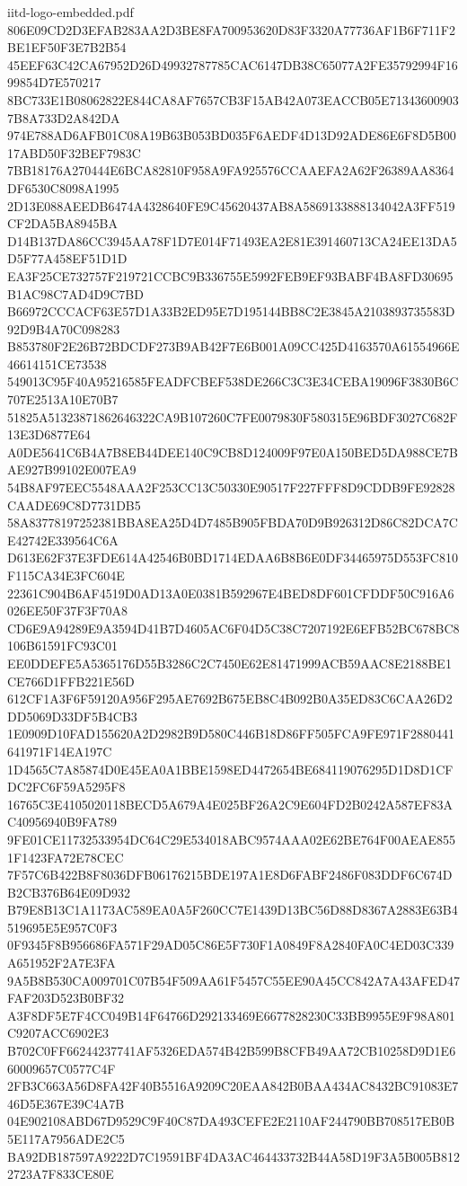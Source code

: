 \begin{filecontents*}[overwrite]{iitd-logo-embedded.pdf}
806E09CD2D3EFAB283AA2D3BE8FA700953620D83F3320A77736AF1B6F711F2BE1EF50F3E7B2B54
45EEF63C42CA67952D26D49932787785CAC6147DB38C65077A2FE35792994F1699854D7E570217
8BC733E1B08062822E844CA8AF7657CB3F15AB42A073EACCB05E713436009037B8A733D2A842DA
974E788AD6AFB01C08A19B63B053BD035F6AEDF4D13D92ADE86E6F8D5B0017ABD50F32BEF7983C
7BB18176A270444E6BCA82810F958A9FA925576CCAAEFA2A62F26389AA8364DF6530C8098A1995
2D13E088AEEDB6474A4328640FE9C45620437AB8A5869133888134042A3FF519CF2DA5BA8945BA
D14B137DA86CC3945AA78F1D7E014F71493EA2E81E391460713CA24EE13DA5D5F77A458EF51D1D
EA3F25CE732757F219721CCBC9B336755E5992FEB9EF93BABF4BA8FD30695B1AC98C7AD4D9C7BD
B66972CCCACF63E57D1A33B2ED95E7D195144BB8C2E3845A2103893735583D92D9B4A70C098283
B853780F2E26B72BDCDF273B9AB42F7E6B001A09CC425D4163570A61554966E46614151CE73538
549013C95F40A95216585FEADFCBEF538DE266C3C3E34CEBA19096F3830B6C707E2513A10E70B7
51825A51323871862646322CA9B107260C7FE0079830F580315E96BDF3027C682F13E3D6877E64
A0DE5641C6B4A7B8EB44DEE140C9CB8D124009F97E0A150BED5DA988CE7BAE927B99102E007EA9
54B8AF97EEC5548AAA2F253CC13C50330E90517F227FFF8D9CDDB9FE92828CAADE69C8D7731DB5
58A83778197252381BBA8EA25D4D7485B905FBDA70D9B926312D86C82DCA7CE42742E339564C6A
D613E62F37E3FDE614A42546B0BD1714EDAA6B8B6E0DF34465975D553FC810F115CA34E3FC604E
22361C904B6AF4519D0AD13A0E0381B592967E4BED8DF601CFDDF50C916A6026EE50F37F3F70A8
CD6E9A94289E9A3594D41B7D4605AC6F04D5C38C7207192E6EFB52BC678BC8106B61591FC93C01
EE0DDEFE5A5365176D55B3286C2C7450E62E81471999ACB59AAC8E2188BE1CE766D1FFB221E56D
612CF1A3F6F59120A956F295AE7692B675EB8C4B092B0A35ED83C6CAA26D2DD5069D33DF5B4CB3
1E0909D10FAD155620A2D2982B9D580C446B18D86FF505FCA9FE971F2880441641971F14EA197C
1D4565C7A85874D0E45EA0A1BBE1598ED4472654BE684119076295D1D8D1CFDC2FC6F59A5295F8
16765C3E4105020118BECD5A679A4E025BF26A2C9E604FD2B0242A587EF83AC40956940B9FA789
9FE01CE11732533954DC64C29E534018ABC9574AAA02E62BE764F00AEAE8551F1423FA72E78CEC
7F57C6B422B8F8036DFB06176215BDE197A1E8D6FABF2486F083DDF6C674DB2CB376B64E09D932
B79E8B13C1A1173AC589EA0A5F260CC7E1439D13BC56D88D8367A2883E63B4519695E5E957C0F3
0F9345F8B956686FA571F29AD05C86E5F730F1A0849F8A2840FA0C4ED03C339A651952F2A7E3FA
9A5B8B530CA009701C07B54F509AA61F5457C55EE90A45CC842A7A43AFED47FAF203D523B0BF32
A3F8DF5E7F4CC049B14F64766D292133469E6677828230C33BB9955E9F98A801C9207ACC6902E3
B702C0FF66244237741AF5326EDA574B42B599B8CFB49AA72CB10258D9D1E660009657C0577C4F
2FB3C663A56D8FA42F40B5516A9209C20EAA842B0BAA434AC8432BC91083E746D5E367E39C4A7B
04E902108ABD67D9529C9F40C87DA493CEFE2E2110AF244790BB708517EB0B5E117A7956ADE2C5
BA92DB187597A9222D7C19591BF4DA3AC464433732B44A58D19F3A5B005B8122723A7F833CE80E

\end{filecontents*}
